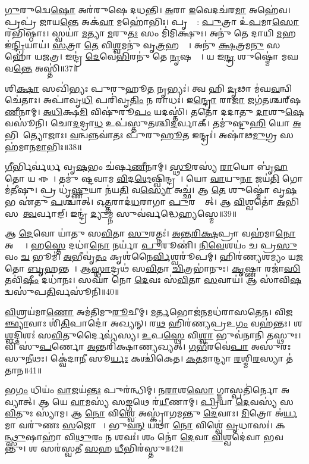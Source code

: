 \ul{𑌗𑍁}𑌰𑍁𑌦𑍍𑌵𑍇\ul{𑌷𑍋} 𑌅𑌰॑𑌰𑍁𑌷𑍇 𑌦𑌧𑌨𑍍𑌤𑌿।
\ul{𑌅}𑌰𑌾 \ul{𑌇}𑌵𑍇𑌦𑌚॑𑌰\ul{𑌮𑌾} 𑌅𑌹𑍇॑𑌵।
𑌪𑍍𑌰𑌪𑍍𑌰॑ 𑌜𑌾𑌯\ul{𑌨𑍍𑌤𑍇} 𑌅𑌕॑\ul{𑌵𑌾} 𑌮𑌹𑍋॑𑌭𑌿𑌃।
𑌪𑍃𑌶𑍍𑌞𑍇᳚: \ul{𑌪𑍁}𑌤𑍍𑌰𑌾 𑌉॑\ul{𑌪}𑌮𑌾\ul{𑌸𑍋} 𑌰𑌭𑌿॑𑌷𑍍𑌠𑌾𑌃।
𑌸𑍍𑌵𑌯𑌾॑ \ul{𑌮}𑌤𑍍𑌯𑌾 \ul{𑌮}𑌰𑍁\ul{𑌤𑌃} 𑌸𑌂 𑌮𑌿॑𑌮𑌿𑌕𑍍𑌷𑍁𑌃।
𑌅𑌨𑍁॑ 𑌤𑍇 𑌦𑌾𑌯𑌿 \ul{𑌮}𑌹 𑌇॑\ul{𑌨𑍍𑌦𑍍𑌰𑌿}𑌯𑌾𑌯॑।
\ul{𑌸}𑌤𑍍𑌰𑌾 \ul{𑌤𑍇} 𑌵𑌿\ul{𑌶𑍍𑌵}𑌮𑌨𑍁॑ 𑌵𑍃\ul{𑌤𑍍𑌰}𑌹𑌤𑍍𑌯𑍇᳚।
𑌅𑌨𑍁॑ \ul{𑌕𑍍𑌷}𑌤𑍍𑌰𑌮\ul{𑌨𑍁} 𑌸𑌹𑍋॑ 𑌯𑌜𑌤𑍍𑌰।
𑌇𑌨𑍍𑌦𑍍𑌰॑ \ul{𑌦𑍇}𑌵𑍇\ul{𑌭𑌿}𑌰𑌨𑍁॑ 𑌤𑍇 \ul{𑌨𑍃}𑌷𑌹𑍍𑌯𑍇᳚।
𑌯 𑌇\ul{𑌨𑍍𑌦𑍍𑌰} 𑌶𑍁𑌷𑍍𑌮𑍋॑ 𑌮𑌘𑌵\ul{𑌨𑍍𑌤𑍇} 𑌅𑌸𑍍𑌤𑌿॑॥37॥

𑌶𑌿\ul{𑌕𑍍𑌷𑌾} 𑌸𑌖𑌿॑𑌭𑍍𑌯𑌃 𑌪𑍁𑌰𑍁𑌹𑍂\ul{𑌤} 𑌨𑍃𑌭𑍍𑌯𑌃॑।
𑌤𑍍𑌵 𑌹𑌿 \ul{𑌦𑍃}𑌢𑌾 𑌮॑𑌘\ul{𑌵}𑌨𑍍𑌵𑌿𑌚𑍇॑𑌤𑌾𑌃।
𑌅𑌪𑌾॑𑌵𑍃\ul{𑌧𑌿} 𑌪𑌰𑌿॑𑌵𑍃\ul{𑌤𑌿𑌂} 𑌨 𑌰𑌾𑌧𑌃॑।
𑌇\ul{𑌨𑍍𑌦𑍍𑌰𑍋} 𑌰𑌾\ul{𑌜𑌾} 𑌜𑌗॑𑌤𑌶𑍍𑌚𑌰𑍍‌\mbox{}𑌷\ul{𑌣𑍀}𑌨𑌾𑌮𑍍।
\ul{𑌅}\ul{𑌧𑌿}𑌕𑍍𑌷\ul{𑌮𑌿} 𑌵𑌿𑌷𑍁॑𑌰𑍂\ul{𑌪𑌂} 𑌯𑌦𑌸𑍍𑌤𑌿॑।
𑌤𑌤𑍋॑ 𑌦𑌦𑌾𑌤𑍁 \ul{𑌦𑌾}𑌶𑍁\ul{𑌷𑍇} 𑌵𑌸𑍂॑𑌨𑌿।
𑌚𑍋\ul{𑌦}𑌦𑍍𑌰𑌾\ul{𑌧} 𑌉𑌪॑𑌸𑍍𑌤𑍁𑌤𑌶𑍍𑌚𑌿\ul{𑌦}𑌰𑍍𑌵𑌾𑌕𑍍।
𑌤𑌮𑍁॑𑌷𑍍𑌟𑍁\ul{𑌹𑌿} 𑌯𑍋 \ul{𑌅}𑌭𑌿𑌭𑍂᳚𑌤𑍍𑌯𑍋𑌜𑌾𑌃।
\ul{𑌵}𑌨𑍍𑌵𑌨𑍍𑌨𑌵𑌾॑𑌤𑌃 𑌪𑍁𑌰𑍁\ul{𑌹𑍂}𑌤 𑌇𑌨𑍍𑌦𑍍𑌰𑌃॑।
𑌅𑌷𑌾॑𑌢\ul{𑌮𑍁}𑌗𑍍𑌰 𑌸𑌹॑𑌮𑌾𑌨\ul{𑌮𑌾}𑌭𑌿𑌃॥38॥

\ul{𑌗𑍀}𑌰𑍍𑌭𑌿𑌰𑍍𑌵॑𑌰𑍍𑌧 𑌵𑍃\ul{𑌷}𑌭𑌂 𑌚॑𑌰𑍍\mbox{}𑌷\ul{𑌣𑍀}𑌨𑌾𑌮𑍍।
\ul{𑌸𑍍𑌥𑍂}𑌰𑌸𑍍𑌯॑ \ul{𑌰𑌾}𑌯𑍋 𑌬𑍃॑\ul{𑌹}𑌤𑍋 𑌯 𑌈𑌶𑍇᳚।
𑌤𑌮𑍁॑ 𑌷𑍍𑌟𑌵𑌾𑌮 \ul{𑌵𑌿}𑌦\ul{𑌥𑍇}𑌷𑍍𑌵𑌿𑌨𑍍𑌦𑍍𑌰𑌮𑍍᳚।
𑌯𑍋 \ul{𑌵𑌾}𑌯𑍁\ul{𑌨𑌾} 𑌜𑌯॑\ul{𑌤𑌿} 𑌗𑍋𑌮॑𑌤𑍀𑌷𑍁।
𑌪𑍍𑌰 𑌧𑍃॑\ul{𑌷𑍍𑌣𑍁}𑌯𑌾 𑌨॑𑌯\ul{𑌤𑌿} 𑌵\ul{𑌸𑍍𑌯𑍋} 𑌅𑌚𑍍𑌛॑।
𑌆 \ul{𑌤𑍇} 𑌶𑍁𑌷𑍍𑌮𑍋॑ 𑌵𑍃\ul{𑌷}𑌭 𑌏॑𑌤𑍁 \ul{𑌪}𑌶𑍍𑌚𑌾𑌤𑍍।
𑌓\ul{𑌤𑍍𑌤}𑌰𑌾𑌦॑\ul{𑌧}𑌰𑌾𑌗𑌾 \ul{𑌪𑍁}𑌰𑌸𑍍𑌤𑌾᳚𑌤𑍍।
𑌆 \ul{𑌵𑌿}𑌶𑍍𑌵𑌤𑍋॑ \ul{𑌅}𑌭𑌿𑌸𑌮𑍇᳚\ul{𑌤𑍍𑌵}𑌰𑍍𑌵𑌾𑌙𑍍।
𑌇𑌨𑍍𑌦𑍍𑌰॑ \ul{𑌦𑍍𑌯𑍁}𑌮𑍍𑌨 𑌸𑍁𑌵॑𑌰𑍍𑌵𑌦𑍍𑌧𑍇\ul{𑌹𑍍𑌯}𑌸𑍍𑌮𑍇॥39॥\anuvakamend[\ul{𑌵}𑌰𑌾𑌹𑍈᳚\ul{𑌰𑍍𑌵𑌿}𑌶𑍍𑌵𑌹𑌾॑\-𑌽𑌜𑌨𑌿𑌷𑍍𑌟 \ul{𑌪𑍂}𑌷𑍋𑌦𑍍𑌵𑌰𑍀॑𑌵𑍃𑌜\ul{𑌤𑍍𑌖𑌾}𑌦𑌯𑍋॑ 𑌵𑌃 \ul{𑌪𑌾}𑌨𑍍𑌤𑍍𑌯\ul{𑌸𑍍𑌤𑍍𑌯𑌾}𑌭𑌿𑌰𑍍𑌨𑌵॑ 𑌚]

𑌆 \ul{𑌦𑍇}𑌵𑍋 𑌯𑌾॑𑌤𑍁 𑌸\ul{𑌵𑌿}𑌤𑌾 \ul{𑌸𑍁}𑌰𑌤𑍍𑌨𑌃॑।
\ul{𑌅}\ul{𑌨𑍍𑌤}\ul{𑌰𑌿}\ul{𑌕𑍍𑌷}𑌪𑍍𑌰𑌾 𑌵𑌹॑𑌮𑌾\ul{𑌨𑍋} 𑌅𑌶𑍍𑌵𑍈𑌃᳚।
𑌹\ul{𑌸𑍍𑌤𑍇} 𑌦𑌧𑌾॑\ul{𑌨𑍋} 𑌨𑌰𑍍𑌯𑌾॑ \ul{𑌪𑍁}𑌰𑍂𑌣𑌿॑।
\ul{𑌨𑌿}\ul{𑌵𑍇}𑌶𑌯𑌂॑ 𑌚 𑌪𑍍𑌰\ul{𑌸𑍁}𑌵𑌂 \ul{𑌚} 𑌭𑍂𑌮॑।
\ul{𑌅}𑌭𑍀𑌵𑍃॑\ul{𑌤𑌂} 𑌕𑍃𑌶॑𑌨𑍈\ul{𑌰𑍍𑌵𑌿}𑌶𑍍𑌵𑌰𑍂॑𑌪𑌮𑍍।
𑌹𑌿𑌰॑𑌣𑍍𑌯𑌶𑌮𑍍𑌯𑌂 𑌯\ul{𑌜}𑌤𑍋 \ul{𑌬𑍃}𑌹𑌨𑍍𑌤𑌮𑍍᳚।
𑌆\ul{𑌸𑍍𑌥𑌾}𑌦𑍍𑌰𑌥॑ 𑌸\ul{𑌵𑌿}𑌤𑌾 \ul{𑌚𑌿}𑌤𑍍𑌰𑌭𑌾॑𑌨𑍁𑌃।
\ul{𑌕𑍃}𑌷𑍍𑌣𑌾 𑌰𑌜𑌾॑\ul{𑌸𑌿} 𑌤𑌵𑌿॑\ul{𑌷𑍀𑌂} 𑌦𑌧𑌾॑𑌨𑌃।
𑌸𑌘𑌾॑ 𑌨𑍋 \ul{𑌦𑍇}𑌵𑌃 𑌸॑\ul{𑌵𑌿}𑌤𑌾 \ul{𑌸}𑌵𑌾𑌯॑।
𑌆 𑌸𑌾॑𑌵𑌿\ul{𑌷}𑌦𑍍𑌵𑌸𑍁॑𑌪\ul{𑌤𑌿}𑌰𑍍𑌵𑌸𑍂॑𑌨𑌿॥40॥

\ul{𑌵𑌿}𑌶𑍍𑌰𑌯॑𑌮𑌾\ul{𑌣𑍋} 𑌅𑌮॑𑌤𑌿𑌮𑍁\ul{𑌰𑍂}𑌚𑍀𑌮𑍍।
\ul{𑌮}\ul{𑌰𑍍𑌤}𑌭𑍋𑌜॑\ul{𑌨}𑌮𑌧॑𑌰𑌾𑌸𑌤𑍇𑌨।
𑌵𑌿𑌜𑌨𑌾᳚\ul{𑌞𑍍𑌛𑍍𑌯𑌾}𑌵𑌾𑌃 𑌶𑌿॑\ul{𑌤𑌿}𑌪𑌾𑌦𑍋॑ 𑌅𑌖𑍍𑌯𑌨𑍍।
𑌰\ul{𑌥}\ul{} 𑌹𑌿𑌰॑𑌣𑍍𑌯𑌪𑍍𑌰𑌉\ul{𑌗𑌂} 𑌵𑌹॑𑌨𑍍𑌤𑌃।
𑌶\ul{𑌶𑍍𑌵}𑌦𑍍𑌦𑌿𑌶𑌃॑ 𑌸\ul{𑌵𑌿}𑌤𑍁𑌰𑍍𑌦𑍈𑌵𑍍𑌯॑𑌸𑍍𑌯।
\ul{𑌉}𑌪\ul{𑌸𑍍𑌥𑍇} 𑌵𑌿\ul{𑌶𑍍𑌵𑌾} 𑌭𑍁𑌵॑𑌨𑌾𑌨𑌿 𑌤𑌸𑍍𑌥𑍁𑌃।
𑌵𑌿 𑌸𑍁॑\ul{𑌪}𑌰𑍍𑌣𑍋 \ul{𑌅}𑌨𑍍𑌤𑌰𑌿॑𑌕𑍍𑌷𑌾𑌣𑍍𑌯𑌖𑍍𑌯𑌤𑍍।
\ul{𑌗}\ul{𑌭𑍀}𑌰𑌵𑍇॑\ul{𑌪𑌾} 𑌅𑌸𑍁॑𑌰𑌃 𑌸𑍁\ul{𑌨𑍀}𑌥𑌃।
𑌕𑍍𑌵𑍇॑𑌦𑌾\ul{𑌨𑍀}\ul{} 𑌸𑍂\ul{𑌰𑍍𑌯𑌃} 𑌕𑌶𑍍𑌚𑌿॑𑌕𑍇𑌤।
\ul{𑌕}\ul{𑌤}𑌮𑌾𑌨𑍍𑌦𑍍𑌯𑌾 \ul{𑌰}𑌶𑍍𑌮𑌿\ul{𑌰}𑌸𑍍𑌯𑌾 𑌤॑𑌤𑌾𑌨॥41॥

𑌭\ul{𑌗𑌂} 𑌧𑌿𑌯𑌂॑ \ul{𑌵𑌾}𑌜𑌯॑\ul{𑌨𑍍𑌤𑌃} 𑌪𑍁𑌰॑𑌨𑍍𑌧𑌿𑌮𑍍।
𑌨\ul{𑌰𑌾}𑌶\ul{𑌸𑍋} 𑌗𑍍𑌨𑌾𑌸𑍍𑌪𑌤𑌿॑𑌰𑍍𑌨𑍋 𑌅𑌵𑍍𑌯𑌾𑌤𑍍।
𑌆 𑌯𑍇 \ul{𑌵𑌾}𑌮𑌸𑍍𑌯॑ 𑌸\ul{𑌙𑍍𑌗}𑌥𑍇 𑌰॑\ul{𑌯𑍀}𑌣𑌾𑌮𑍍।
\ul{𑌪𑍍𑌰𑌿}𑌯𑌾 \ul{𑌦𑍇}𑌵𑌸𑍍𑌯॑ 𑌸\ul{𑌵𑌿}𑌤𑍁𑌃 𑌸𑍍𑌯𑌾॑𑌮।
𑌆 \ul{𑌨𑍋} 𑌵𑌿\ul{𑌶𑍍𑌵𑍇} 𑌅𑌸𑍍𑌕𑍍𑌰𑌾॑𑌗𑌮𑌨𑍍𑌤𑍁 \ul{𑌦𑍇}𑌵𑌾𑌃।
\ul{𑌮𑌿}𑌤𑍍𑌰𑍋 𑌅॑\ul{𑌰𑍍𑌯}𑌮𑌾 𑌵𑌰𑍁॑𑌣𑌃 \ul{𑌸}𑌜𑍋𑌷𑌾𑌃᳚।
𑌭𑍁\ul{𑌵}\ul{𑌨𑍍} 𑌯𑌥𑌾॑ \ul{𑌨𑍋} 𑌵𑌿𑌶𑍍𑌵𑍇॑ \ul{𑌵𑍃}𑌧𑌾𑌸𑌃॑।
𑌕𑌰᳚\ul{𑌨𑍍𑌥𑍍𑌸𑍁}𑌷𑌾𑌹𑌾॑ 𑌵𑌿\ul{𑌥𑍁}𑌰𑌂 𑌨 𑌶𑌵𑌃॑।
𑌶𑌂 𑌨𑍋॑ \ul{𑌦𑍇}𑌵𑌾 \ul{𑌵𑌿}𑌶𑍍𑌵𑌦𑍇॑𑌵𑌾 𑌭𑌵𑌨𑍍𑌤𑍁।
𑌶 𑌸𑌰॑𑌸𑍍𑌵𑌤𑍀 \ul{𑌸}𑌹 \ul{𑌧𑍀}𑌭𑌿𑌰॑𑌸𑍍𑌤𑍁॥42॥

